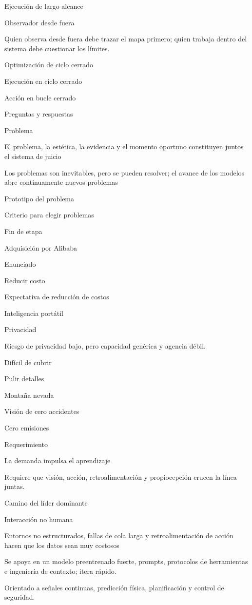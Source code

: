 \documentclass{article}
\begin{document}
Ejecución de largo alcance

Observador desde fuera

Quien observa desde fuera debe trazar el mapa primero; quien trabaja dentro del sistema debe cuestionar los límites.

Optimización de ciclo cerrado

Ejecución en ciclo cerrado

Acción en bucle cerrado

Preguntas y respuestas

Problema

El problema, la estética, la evidencia y el momento oportuno constituyen juntos el sistema de juicio

Los problemas son inevitables, pero se pueden resolver; el avance de los modelos abre continuamente nuevos problemas

Prototipo del problema

Criterio para elegir problemas

Fin de etapa

Adquisición por Alibaba

Enunciado

Reducir costo

Expectativa de reducción de costos

Inteligencia portátil

Privacidad

Riesgo de privacidad bajo, pero capacidad genérica y agencia débil.

Difícil de cubrir

Pulir detalles

Montaña nevada

Visión de cero accidentes

Cero emisiones

Requerimiento

La demanda impulsa el aprendizaje

Requiere que visión, acción, retroalimentación y propiocepción crucen la línea juntas.

Camino del líder dominante

Interacción no humana

Entornos no estructurados, fallas de cola larga y retroalimentación de acción hacen que los datos sean muy costosos

Se apoya en un modelo preentrenado fuerte, prompts, protocolos de herramientas e ingeniería de contexto; itera rápido.

Orientado a señales continuas, predicción física, planificación y control de seguridad.
\end{document}
